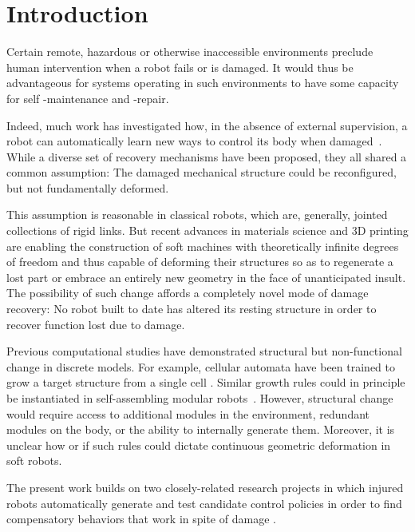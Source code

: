 \section{Introduction}
\label{sec5:intro}


Certain remote, hazardous or otherwise inaccessible environments preclude human intervention when a robot fails or is damaged.
It would thus be advantageous for systems operating in such environments to have some capacity for self -maintenance and -repair.


Indeed, much work has investigated how,
in the absence of external supervision,
a robot can automatically learn new ways to control its body when damaged~\mbox{\cite{bongard2006resilient, chatzilygeroudis2018reset, cully2015robots, kano2017brittle, kwiatkowski2019task, mahdavi2003evolutionary, ren2015multiple}.}
While a diverse set of recovery mechanisms have been proposed, they all  
shared a common assumption: 
The damaged mechanical structure could be 
reconfigured, but not fundamentally deformed.


This assumption is reasonable in classical robots, which are, generally, jointed collections of rigid links.
But recent advances in materials science and 3D printing are enabling the construction of soft machines with theoretically infinite degrees of freedom and thus capable of deforming their
structures so as to regenerate a lost part or embrace an entirely new geometry in the face of unanticipated insult. 
The possibility of such change affords a completely novel mode of damage recovery:
No robot built to date has altered its resting structure in order to recover function lost due to damage.


Previous computational studies have demonstrated structural but non-functional change in discrete models.
For example, cellular automata have been trained to grow a target structure from a single cell \cite{eggenberger1997evolving, miller2004evolving}.
Similar growth rules could in principle be instantiated in self-assembling modular robots~\cite{white2005three,zykov2005robotics}.
However, structural change would require access to additional modules in the environment, redundant modules on the body, or the ability to internally generate them.
Moreover, it is unclear how or if such rules could dictate continuous geometric deformation in soft robots.

The present work builds on two closely-related research projects in which injured robots automatically generate and test candidate control policies in order to find compensatory behaviors that work in spite of damage
\cite{bongard2006resilient,cully2015robots}.



